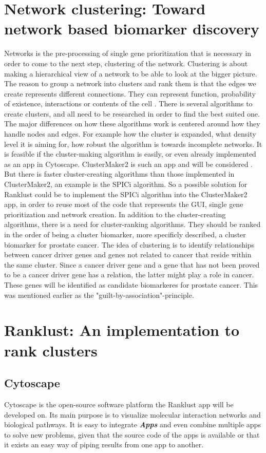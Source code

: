 \chapter{Network clustering: Toward network based biomarker discovery}
Networks is the pre-processing of single gene prioritization that is necessary
in order to come to the next step, clustering of the network. Clustering is
about making a hierarchical view of a network to be able to look at the bigger
picture. The reason to group a network into clusters and rank them
is that the edges we create represents different connections. They can represent
function, probability of existence, interactions or contents of the cell
\cite{siri}. There is several algorithms to create clusters, and all need to be
researched in order to find the best suited one. The major differences on how
these algorithms work is centered around how they handle nodes and edges. For
example how the cluster is expanded, what density level it is aiming for, how
robust the algorithm is towards incomplete networks. It is feasible if the
cluster-making algorithm is easily, or even already implemented as an app in
Cytoscape. ClusterMaker2 is such an app and will be considered \cite{cm2}. But
there is faster cluster-creating algorithms than those implemented in
ClusterMaker2, an example is the SPICi \cite{spici} algorithm. So a possible
solution for Ranklust could be to implement the SPICi algorithm into the
ClusterMaker2 app, in order to reuse most of the code that represents the GUI,
single gene prioritization and network creation. In addition to the
cluster-creating algorithms, there is a need for cluster-ranking algorithms.
They should be ranked in the order of being a cluster biomarker, more specificly
described, a cluster biomarker for prostate cancer. The idea of clustering is to
identify relationships between cancer driver genes and genes not related to
cancer that reside within the same cluster. Since a cancer driver gene and a
gene that has not been proved to be a cancer driver gene has a relation, the
latter might play a role in cancer. These genes will be identified as candidate
biomarkeres for prostate cancer. This was mentioned earlier as the
"guilt-by-association"-principle.

\chapter{Ranklust: An implementation to rank clusters}
\section{Cytoscape}
Cytoscape is the open-source software platform the Ranklust app will be
developed on. Its main purpose is to visualize molecular interaction networks
and biological pathways.  It is easy to integrate \textbf{\textit{Apps}} and
even combine multiple apps to solve new problems, given that the source code of
the apps is available or that it exists an easy way of piping results from one
app to another. 

